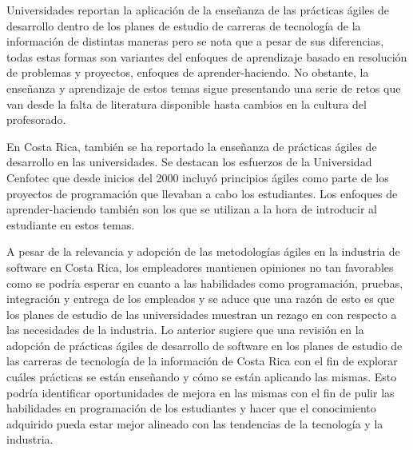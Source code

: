 \documentclass[journal]{IEEEtran}
\begin{document}
Universidades reportan la aplicación de la enseñanza de las prácticas ágiles de desarrollo dentro de los planes de estudio de carreras de tecnología de la información de distintas maneras pero se nota que a pesar de sus diferencias, todas estas formas son variantes del enfoques de aprendizaje basado en resolución de problemas y proyectos, enfoques de aprender-haciendo. No obstante, la enseñanza y aprendizaje de estos temas sigue presentando una serie de retos que van desde la falta de literatura disponible hasta cambios en la cultura del profesorado.

En Costa Rica, también se ha reportado la enseñanza de prácticas ágiles de desarrollo en las universidades. Se destacan los esfuerzos de la Universidad Cenfotec que desde inicios del 2000 incluyó principios ágiles como parte de los proyectos de programación que llevaban a cabo los estudiantes. Los enfoques de aprender-haciendo también son los que se utilizan a la hora de introducir al estudiante en estos temas. 

A pesar de la relevancia y adopción de las metodologías ágiles en la industria de software en Costa Rica, los empleadores mantienen opiniones no tan favorables como se podría esperar en cuanto a las habilidades como programación, pruebas, integración y entrega de los empleados y se aduce que una razón de esto es que los planes de estudio de las universidades muestran un rezago en con respecto a las necesidades de la industria. Lo anterior sugiere que una revisión en la adopción de prácticas ágiles de desarrollo de software en los planes de estudio de las carreras de tecnología de la información de Costa Rica con el fin de explorar cuáles prácticas se están enseñando y cómo se están aplicando las mismas. Esto podría identificar oportunidades de mejora en las mismas con el fin de pulir las habilidades en programación de los estudiantes y hacer que el conocimiento adquirido pueda estar mejor alineado con las tendencias de la tecnología y la industria.



%
%
\end{document}
